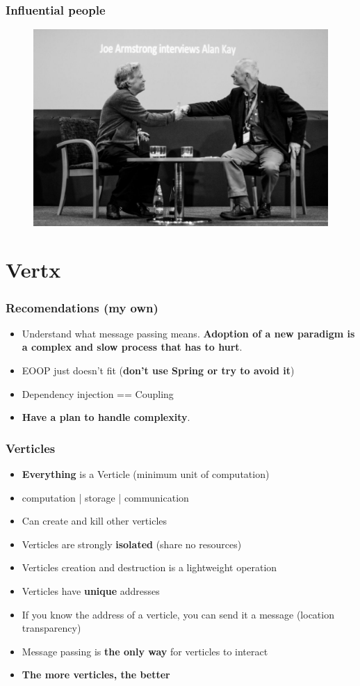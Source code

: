 \documentclass{beamer}
\begin{document}
\begin{frame}
\frametitle{Influential people}
\begin{figure}
\includegraphics[scale=0.25]{images/joe_and_alan.jpg}
\end{figure}
\end{frame} 

\section{Vertx}

\begin{frame}
\frametitle{Recomendations (my own)}
\begin{itemize}
\item<1-> Understand what message passing means. \textbf{Adoption of a new paradigm is a complex and slow process that has to hurt}.
\item<2-> EOOP just doesn't fit (\textbf{don't use Spring or try to avoid it})
\item <3->Dependency injection == Coupling
\item<4-> \textbf{Have a plan to handle complexity}.
\end{itemize}
\end{frame} 


\begin{frame}
\frametitle{Verticles}
\begin{itemize}
 \item<1-> \textbf{Everything} is a Verticle (minimum unit of computation)
 \item<2-> computation | storage | communication
 \item<3-> Can create and kill other verticles
 \item<4-> Verticles are strongly \textbf{isolated} (share no resources)
 \item<5-> Verticles creation and destruction is a lightweight operation
 \item<6-> Verticles have \textbf{unique} addresses
 \item<7-> If you know the address  of a verticle, you can send it a message (location transparency)
 \item<8-> Message passing is \textbf{the only way} for verticles to interact
 \item<9-> \textbf{The more verticles, the better}
\end{itemize}
\end{frame}
\end{document}
